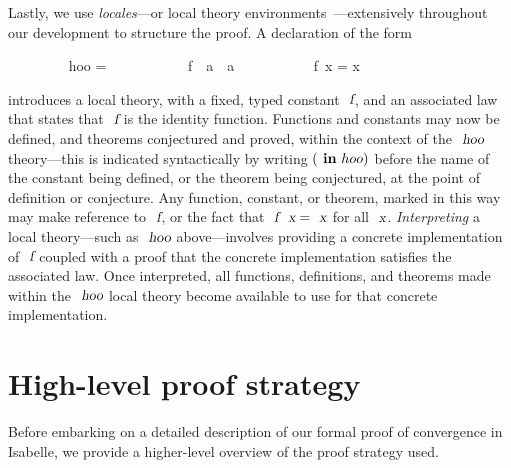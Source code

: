 \documentclass[acmlarge,review,anonymous]{acmart}\settopmatter{printfolios=true}
\begin{document}
Lastly, we use \emph{locales}---or local theory environments~\cite{DBLP:conf/tphol/KammullerWP99,DBLP:conf/types/HaftmannW08}---extensively throughout our development to structure the proof.
A declaration of the form
\\
\begin{isabellebody}
\ \ \ \ \ \ \ \  hoo = \isanewline
\ \ \ \ \ \ \ \ \ \ \ f\ {\isacharcolon}{\isacharcolon}\ {\isachardoublequoteopen}{\isacharprime}a\ {\isasymRightarrow}\ {\isacharprime}a{\isachardoublequoteclose}\isanewline
\ \ \ \ \ \ \ \ \ \  {\isachardoublequoteopen}f\ x = x{\isachardoublequoteclose}
\end{isabellebody}
\vspace{\baselineskip}
\noindent
introduces a local theory, with a fixed, typed constant $\isa{f}$, and an associated law that states that $\isa{f}$ is the identity function.
Functions and constants may now be defined, and theorems conjectured and proved, within the context of the $\isa{hoo}$ theory---this is indicated syntactically by writing $(\isacommand{in}\ hoo)$ before the name of the constant being defined, or the theorem being conjectured, at the point of definition or conjecture.
Any function, constant, or theorem, marked in this way may make reference to $\isa{f}$, or the fact that $\isa{f}\ \isa{x} = \isa{x}$ for all $\isa{x}$.
\emph{Interpreting} a local theory---such as $\isa{hoo}$ above---involves providing a concrete implementation of $\isa{f}$ coupled with a proof that the concrete implementation satisfies the associated law.
Once interpreted, all functions, definitions, and theorems made within the $\isa{hoo}$ local theory become available to use for that concrete implementation.





\section{High-level proof strategy}
\label{sect.high-level.proof.strategy}

Before embarking on a detailed description of our formal proof of convergence in Isabelle, we provide a higher-level overview of the proof strategy used.

\end{document}
